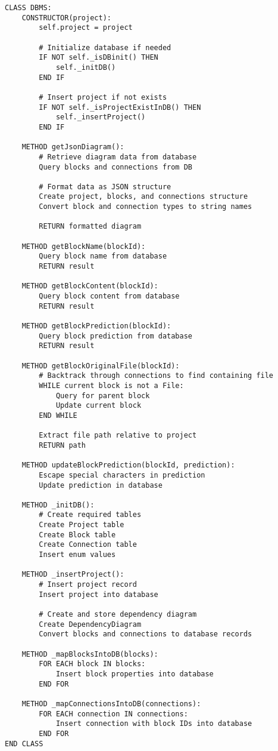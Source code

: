 \begin{lstlisting}[language=pseudocode, caption={$\texttt{DBMS}$ class (Pseudocode).}, label={lst:21}]
CLASS DBMS:
    CONSTRUCTOR(project):
        self.project = project
        
        # Initialize database if needed
        IF NOT self._isDBinit() THEN
            self._initDB()
        END IF
        
        # Insert project if not exists
        IF NOT self._isProjectExistInDB() THEN
            self._insertProject()
        END IF
    
    METHOD getJsonDiagram():
        # Retrieve diagram data from database
        Query blocks and connections from DB
        
        # Format data as JSON structure
        Create project, blocks, and connections structure
        Convert block and connection types to string names
        
        RETURN formatted diagram
    
    METHOD getBlockName(blockId):
        Query block name from database
        RETURN result
    
    METHOD getBlockContent(blockId):
        Query block content from database
        RETURN result
    
    METHOD getBlockPrediction(blockId):
        Query block prediction from database
        RETURN result
    
    METHOD getBlockOriginalFile(blockId):
        # Backtrack through connections to find containing file
        WHILE current block is not a File:
            Query for parent block
            Update current block
        END WHILE
        
        Extract file path relative to project
        RETURN path
    
    METHOD updateBlockPrediction(blockId, prediction):
        Escape special characters in prediction
        Update prediction in database
    
    METHOD _initDB():
        # Create required tables
        Create Project table
        Create Block table
        Create Connection table
        Insert enum values
    
    METHOD _insertProject():
        # Insert project record
        Insert project into database
        
        # Create and store dependency diagram
        Create DependencyDiagram
        Convert blocks and connections to database records
    
    METHOD _mapBlocksIntoDB(blocks):
        FOR EACH block IN blocks:
            Insert block properties into database
        END FOR
    
    METHOD _mapConnectionsIntoDB(connections):
        FOR EACH connection IN connections:
            Insert connection with block IDs into database
        END FOR
END CLASS
\end{lstlisting}